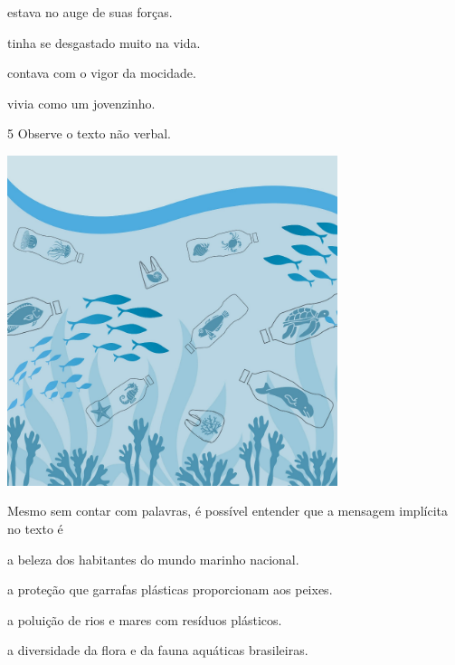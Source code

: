 \begin{escolha}
\item estava no auge de suas forças.

\item tinha se desgastado muito na vida.

\item contava com o vigor da mocidade.

\item vivia como um jovenzinho.
\end{escolha}

\pagebreak
\num{5} Observe o texto não verbal.

\begin{myquote}
\begin{center}
\includegraphics[width=3.8in,height=3.8in]{./media/simulados/image4.png}
\end{center}
\end{myquote}

Mesmo sem contar com palavras, é possível entender que a mensagem
implícita no texto é

\begin{escolha}
\item a beleza dos habitantes do mundo marinho nacional.

\item a proteção que garrafas plásticas proporcionam aos peixes.

\item a poluição de rios e mares com resíduos plásticos.

\item a diversidade da flora e da fauna aquáticas brasileiras.
\end{escolha}


